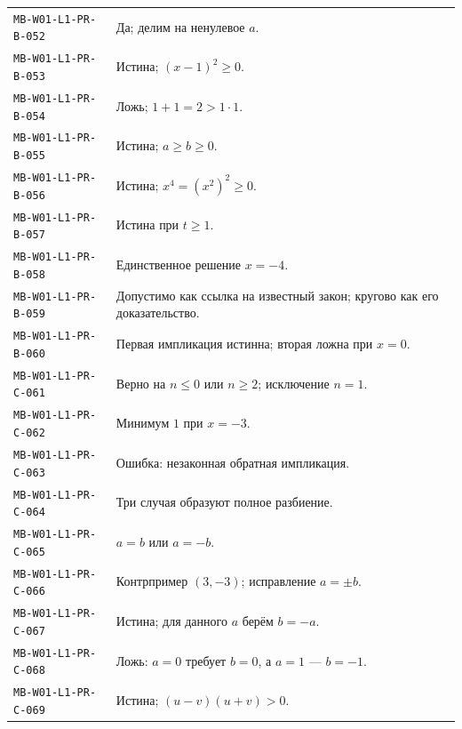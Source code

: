 \documentclass[11pt,a4paper,openany]{book}
\newcommand{\muid}[1]{\texttt{\footnotesize #1}}
\begin{document}
\begin{longtable}{p{}p{}}
\muid{MB-W01-L1-PR-B-052} & Да; делим на ненулевое $a$.\\

\muid{MB-W01-L1-PR-B-053} & Истина; $(x-1)^2\ge0$.\\

\muid{MB-W01-L1-PR-B-054} & Ложь; $1+1=2>1\cdot1$.\\

\muid{MB-W01-L1-PR-B-055} & Истина; $a\ge b\ge0$.\\

\muid{MB-W01-L1-PR-B-056} & Истина; $x^4=(x^2)^2\ge0$.\\

\muid{MB-W01-L1-PR-B-057} & Истина при $t\ge1$.\\

\muid{MB-W01-L1-PR-B-058} & Единственное решение $x=-4$.\\

\muid{MB-W01-L1-PR-B-059} & Допустимо как ссылка на известный закон; кругово как его доказательство.\\

\muid{MB-W01-L1-PR-B-060} & Первая импликация истинна; вторая ложна при $x=0$.\\

\muid{MB-W01-L1-PR-C-061} & Верно на $n\le0$ или $n\ge2$; исключение $n=1$.\\

\muid{MB-W01-L1-PR-C-062} & Минимум $1$ при $x=-3$.\\

\muid{MB-W01-L1-PR-C-063} & Ошибка: незаконная обратная импликация.\\

\muid{MB-W01-L1-PR-C-064} & Три случая образуют полное разбиение.\\

\muid{MB-W01-L1-PR-C-065} & $a=b$ или $a=-b$.\\

\muid{MB-W01-L1-PR-C-066} & Контрпример $(3,-3)$; исправление $a=\pm b$.\\

\muid{MB-W01-L1-PR-C-067} & Истина; для данного $a$ берём $b=-a$.\\

\muid{MB-W01-L1-PR-C-068} & Ложь: $a=0$ требует $b=0$, а $a=1$ — $b=-1$.\\

\muid{MB-W01-L1-PR-C-069} & Истина; $(u-v)(u+v)>0$.\\


\end{longtable}
\end{document}
